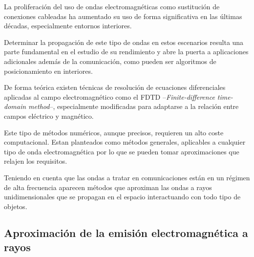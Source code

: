 


La proliferación del uso de ondas electromagnéticas como sustitución de conexiones cableadas ha aumentado su uso de forma significativa en las últimas décadas, especialmente entornos interiores.

Determinar la propagación de este tipo de ondas en estos escenarios resulta una parte fundamental en el estudio de su rendimiento y abre la puerta a aplicaciones adicionales además de la comunicación, como pueden ser algoritmos de posicionamiento en interiores.

De forma teórica existen técnicas de resolución de ecuaciones diferenciales aplicadas al campo electromagnético como el FDTD --\textit{Finite-difference time-domain method}--, especialmente modificadas para adaptarse a la relación entre campos eléctrico y magnético.

Este tipo de métodos numéricos, aunque precisos, requieren un alto coste computacional.
Estan planteados como métodos generales, aplicables a cualquier tipo de onda electromagnética por lo que se pueden tomar aproximaciones que relajen los requisitos.

Teniendo en cuenta que las ondas a tratar en comunicaciones están en un régimen de alta frecuencia aparecen métodos que aproximan las ondas a rayos unidimensionales que se propagan en el espacio interactuando con todo tipo de objetos.

\subsection{Aproximación de la emisión electromagnética a rayos}

